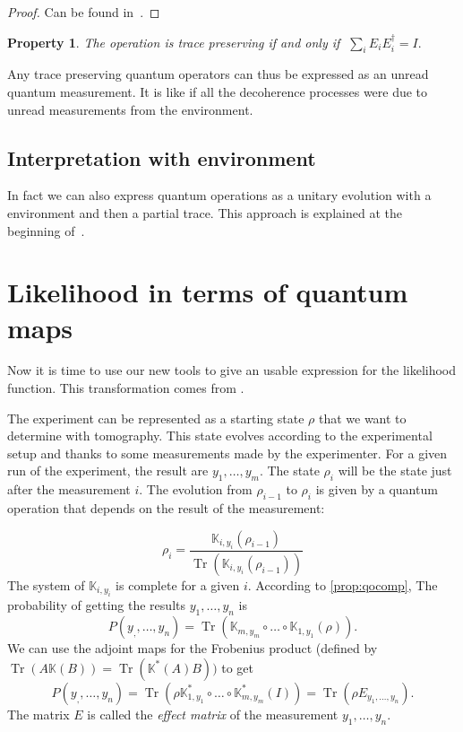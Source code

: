 \documentclass[10pt,a4paper]{report}
\theoremstyle{plain}
\newtheorem{prop}[thm]{Property}
\theoremstyle{definition}
\theoremstyle{remark}
\DeclareMathOperator{\Tr}{Tr}
\newcommand{\trnorm}[1]{\frac{#1}{\Tr\left({#1}\right)}}
\begin{document}
\begin{proof}
  Can be found in~\cite{QCQI}.
\end{proof}

\begin{prop}
  The operation is trace preserving if and only if
$\; \displaystyle \sum_i E_i E_i^\dagger = I.$
\end{prop}


Any trace preserving quantum operators can thus be expressed as an unread
quantum measurement. It is like if all the decoherence processes were due to unread
measurements from the environment.

\subsection{Interpretation with environment}\label{ssec:interp}


In fact we can also express quantum operations as a unitary evolution with a environment and then a
partial trace. This approach is explained at the beginning of~\cite{QCQI}.

\section{Likelihood in terms of quantum maps}

Now it is time to use our new tools to give an usable expression for the
likelihood function. This transformation comes from \cite{SPRQT16}.

The experiment can be represented as a starting state $\rho$ that we
want to determine with tomography. This state evolves according to the
experimental setup and thanks to some measurements made by the experimenter. For
a given run of the experiment, the result are $y_1,\ldots,y_m$.
The state $\rho_i$ will be the state just after the measurement $i$. The
evolution from $\rho_{i-1}$ to $\rho_i$ is given by a quantum operation that
depends on the result of the measurement:

\[\rho_i = \trnorm{\mathbb K_{i,y_i}(\rho_{i-1})}\]
The system of $\mathbb K_{i,y_i}$ is complete for a given $i$. According to
\cref{prop:qocomp}, The probability of getting the results $y_1, \ldots, y_n$ is
\[P(y_,,\ldots, y_n) = \Tr(\mathbb K_{m,y_m} \circ \ldots \circ \mathbb K_{1,y_1}(\rho)).\]
We can use the adjoint maps for the Frobenius product (defined by $\Tr(A\mathbb K(B)) = \Tr(\mathbb
K^*(A)B))$ to get
\[P(y_,,\ldots, y_n) = \Tr(\rho \mathbb K_{1,y_1}^* \circ \ldots \circ \mathbb
  K_{m,y_m}^*(I)) = \Tr(\rho E_{y_1,\ldots, y_n}).\]
The matrix $E$ is called the \emph{effect matrix} of the measurement
$y_1,\ldots,y_n$.
\end{document}
